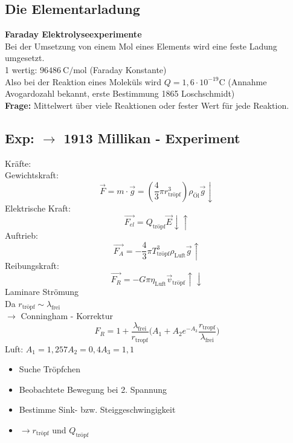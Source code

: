 \documentclass[titlepage,12pt,a4paper,ngerman]{report}
\newcommand{\tx}[1]{\textrm{#1}}
\begin{document}
\subsection{Die Elementarladung}
\textbf{Faraday Elektrolyseexperimente}\\
Bei der Umsetzung von einem Mol eines Elements wird eine feste Ladung umgesetzt.\\
1 wertig: $96486\ \tx{C}/\tx{mol}$ (Faraday Konstante)\\
Also bei der Reaktion eines Moleküls wird $Q=1,6\cdot 10^{-19} \tx{C}$ (Annahme Avogardozahl bekannt, erste Bestimmung 1865 Loschschmidt)\\
\textbf{Frage:} Mittelwert über viele Reaktionen oder fester Wert für jede Reaktion.
\subsection*{Exp: $\rightarrow$ 1913 Millikan - Experiment}
Kräfte:\\
Gewichtskraft: $$\vec{F}=m\cdot \vec{g}=(\frac{4}{3}\pi r_{\textrm{tröpf}}^3)\rho_{\textrm{Öl}}\vec{g} \downarrow$$
Elektrische Kraft: $$\vec{F_{el}}=Q_{\textrm{tröpf}}\vec{E}\downarrow \uparrow$$
Auftrieb: $$\vec{F_A}=-\frac{4}{3}\pi T^3_{\textrm{tröpf}} \rho_{\tx{Luft}} \vec{g} \uparrow$$
Reibungskraft: $$\vec{F_R}=-G \pi \eta_{\tx{Luft}} \vec{v}_{\textrm{tröpf}} \uparrow \downarrow $$
Laminare Strömung\\
Da $r_{\textrm{tröpf}} \sim \lambda_{\tx{frei}} $\\
$\rightarrow $ Conningham - Korrektur
$$F_R = 1+\frac{\lambda_{\tx{frei}}}{r_{\tx{tropf}}} \bigg(A_1 +A_2 e^{-A_3} \frac{r_{\tx{tropf}}}{\lambda_{\tx{frei}}}\bigg)$$
Luft: $A_1 = 1,257 A_2=0,4 A_3 = 1,1$
\begin{itemize}
\item Suche Tröpfchen
\item Beobachtete Bewegung bei 2. Spannung
\item Bestimme Sink- bzw. Steiggeschwingigkeit
\item $\rightarrow r_{\textrm{tröpf}}$ und $ Q_{\textrm{tröpf}}$
\end{itemize}
\end{document}
